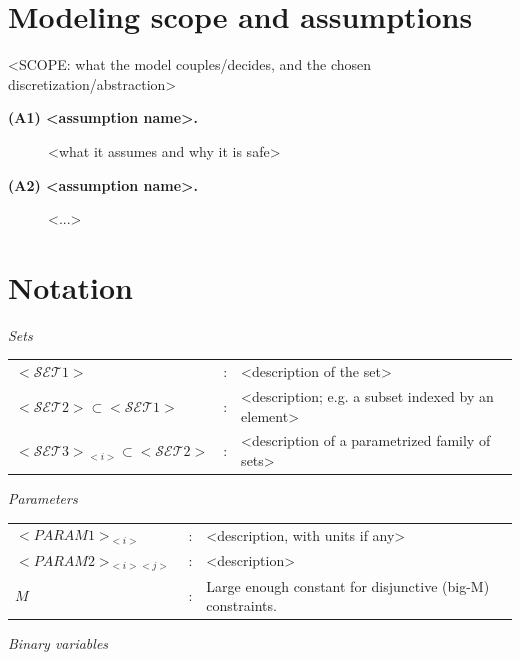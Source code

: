 \section{Modeling scope and assumptions}
<SCOPE: what the model couples/decides, and the chosen discretization/abstraction>
\begin{description}
  \item[\textbf{(A1) <assumption name>.}] <what it assumes and why it is safe>
  \item[\textbf{(A2) <assumption name>.}] <...>
\end{description}

\section{Notation}\label{sec:<slug>-notation}

\noindent \textit{Sets}

\begin{tabular}{p{22mm}lp{105mm}}
    $\mathcal{<SET1>}$                              & : & <description of the set> \\
    $\mathcal{<SET2>} \subset \mathcal{<SET1>}$     & : & <description; e.g. a subset indexed by an element> \\
    $\mathcal{<SET3>}_{<i>} \subset \mathcal{<SET2>}$ & : & <description of a parametrized family of sets> \\
\end{tabular}

\bigskip
\noindent \textit{Parameters}

\begin{longtable}{p{16mm}lp{108mm}}
    $<PARAM1>_{<i>}$        & : & <description, with units if any> \\
    $<PARAM2>_{<i><j>}$     & : & <description> \\
    $M$                     & : & Large enough constant for disjunctive (big-M) constraints. \\
\end{longtable}

\bigskip
\noindent \textit{Binary variables}

